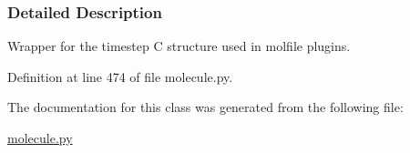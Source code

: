 \subsubsection{Detailed Description}
Wrapper for the timestep C structure used in molfile plugins. 



Definition at line 474 of file molecule.\-py.



The documentation for this class was generated from the following file\-:\begin{DoxyCompactItemize}
\item 
\hyperlink{molecule_8py}{molecule.\-py}\end{DoxyCompactItemize}
